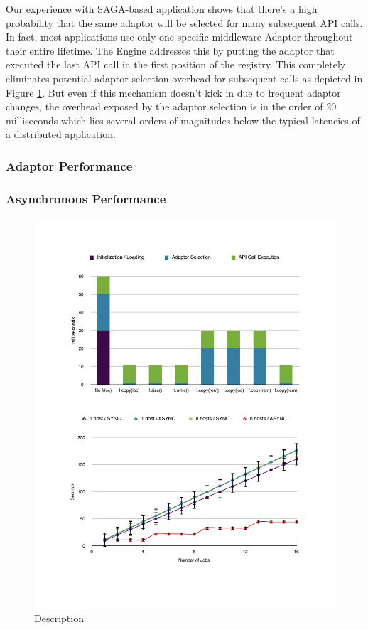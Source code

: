 Our experience with SAGA-based application shows that there’s a high probability that the same adaptor will be selected for many subsequent API calls. In fact, most applications use only one specific middleware Adaptor throughout their entire lifetime. The Engine addresses this by putting the adaptor that executed the last API call in the first position of the registry. This completely eliminates potential adaptor selection overhead for subsequent calls as depicted in Figure \ref{perf_overhead}. But even if this mechanism doesn't kick in due to frequent adaptor changes, the overhead exposed by the adaptor selection is in the order of 20 milliseconds which lies several orders of magnitudes below the typical latencies of a distributed application.


\subsubsection{Adaptor Performance}\label{perf_adaptors}

\subsubsection{Asynchronous Performance}\label{perf_async}


\begin{figure}[!ht]
  \begin{center}
      \includegraphics[width=1\textwidth]{../figures/perf_async_1.pdf}
  \end{center}
 \up\up\up\up\up
  \caption{\small Description}
 \label{perf_overhead}
\end{figure}
